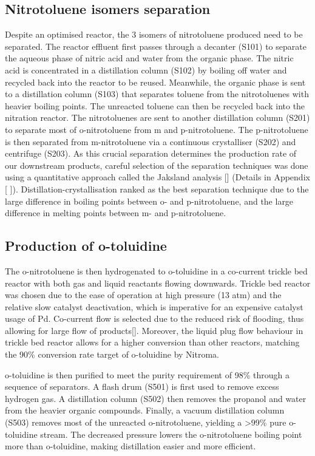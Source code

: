 \subsection{Nitrotoluene isomers separation}
Despite an optimised reactor, the 3 isomers of nitrotoluene produced need to be separated. The reactor effluent first passes through a decanter (S101) to separate the aqueous phase of nitric acid and water from the organic phase. The nitric acid is concentrated in a distillation column (S102) by boiling off water and recycled back into the reactor to be reused. Meanwhile, the organic phase is sent to a distillation column (S103) that separates toluene from the nitrotoluenes with heavier boiling points. The unreacted toluene can then be recycled back into the nitration reactor. The nitrotoluenes are sent to another distillation column (S201) to separate most of o-nitrotoluene from m and p-nitrotoluene. The p-nitrotoluene is then separated from m-nitrotoluene via a continuous crystalliser (S202) and centrifuge (S203). As this crucial separation determines the production rate of our downstream products, careful selection of the separation techniques was done using a quantitative approach called the Jaksland analysis [] (Details in Appendix [ ]). Distillation-crystallisation ranked as the best separation technique due to the large difference in boiling points between o- and p-nitrotoluene, and the large difference in melting points between m- and p-nitrotoluene.

\subsection{Production of o-toluidine}
The o-nitrotoluene is then hydrogenated to o-toluidine in a co-current trickle bed reactor with both gas and liquid reactants flowing downwards. Trickle bed reactor was chosen due to the ease of operation at high pressure (13 atm) and the relative slow catalyst deactivation, which is imperative for an expensive catalyst usage of Pd. Co-current flow is selected due to the reduced risk of flooding, thus allowing for large flow of products[]. Moreover, the liquid plug flow behaviour in trickle bed reactor allows for a higher conversion than other reactors, matching the 90\% conversion rate target of o-toluidine by Nitroma. 

o-toluidine is then purified to meet the purity requirement of 98\% through a sequence of separators. A flash drum (S501) is first used to remove excess hydrogen gas. A distillation column (S502) then removes the propanol and water from the heavier organic compounds. Finally, a vacuum distillation column (S503) removes most of the unreacted o-nitrotoluene, yielding a >99\% pure o-toluidine stream. The decreased pressure lowers the o-nitrotoluene boiling point more than o-toluidine, making distillation easier and more efficient.  
 
